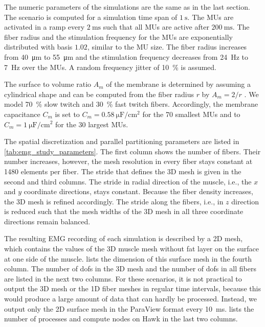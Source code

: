 The numeric parameters of the simulations are the same as in the last section. The scenario is computed for a simulation time span of $\SI{1}{\s}$. The MUs are activated in a ramp every $\SI{2}{\ms}$ such that all MUs are active after $\SI{200}{\ms}$. The fiber radius
and the stimulation frequency for the MUs are exponentially distributed with basis $1.02$, similar to the MU size. The fiber radius increases from \SI{40}{\micro\meter} to \SI{55}{\micro\meter} and the stimulation frequency decreases from \SI{24}{\hertz} to \SI{7}{\hertz} over the MUs. A random frequency jitter of \SI{10}{\percent} is assumed.

The surface to volume ratio $A_m$ of the membrane is determined by assuming a cylindrical shape and can be computed from the fiber radius $r$ by $A_m = 2/r$ \cite{Klotz2020}. We model \SI{70}{\percent} slow twitch and \SI{30}{\percent} fast twitch fibers. Accordingly, the membrane capacitance $C_m$ is set to $C_m = \SI{0.58}{\micro\farad\per\centi\meter\squared}$ for the 70 smallest MUs and to $C_m = \SI{1}{\micro\farad\per\centi\meter\squared}$ for the 30 largest MUs.

The spatial discretization and parallel partitioning parameters are listed in \cref{tab:emg_study_parameters}. The first column shows the number of fibers. Their number increases, however, the mesh resolution in every fiber stays constant at 1480 elements per fiber. The stride that defines the 3D mesh is given in the second and third columns. The stride in radial direction of the muscle, i.e., the $x$ and $y$ coordinate directions, stays constant. Because the fiber density increases, the 3D mesh is refined accordingly. The stride along the fibers, i.e., in $z$ direction is reduced such that the mesh widths of the 3D mesh in all three coordinate directions remain balanced.

The resulting EMG recording of each simulation is described by a 2D mesh, which contains the values of the 3D muscle mesh without fat layer on the surface at one side of the muscle.  lists the dimension of this surface mesh in the fourth column. 
The number of dofs in the 3D mesh and the number of dofs in all fibers are listed in the next two columns. For these scenarios, it is not practical to output the 3D mesh or the 1D fiber meshes in regular time intervals, because this would produce a large amount of data that can hardly be processed. Instead, we output only the 2D surface mesh in the ParaView format every \SI{10}{\milli\second}.
 lists the number of processes and compute nodes on Hawk in the last two columns.

